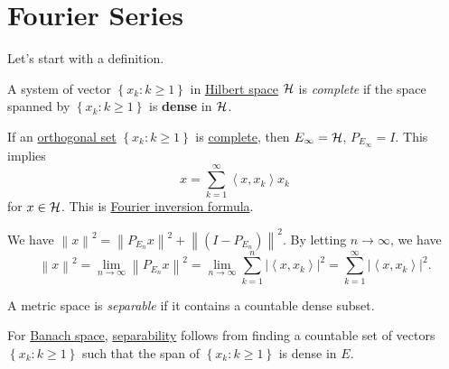 \section{Fourier Series}
Let's start with a definition.
\begin{definition}\label{def:complete-system}
	A system of vector \(\left\{ x_k\colon k\geq 1 \right\} \) in \hyperref[def:Hilbert-space]{Hilbert space} \(\mathcal{\MakeUppercase{h}} \) is \emph{complete} if the space spanned by \(\left\{ x_k\colon k\geq 1 \right\}\) is \textbf{dense} in \(\mathcal{\MakeUppercase{h}} \).
\end{definition}

\begin{eg}
	If an \hyperref[def:orthogonal-system]{orthogonal set} \(\left\{ x_{k} \colon k\geq 1 \right\} \) is \hyperref[def:complete-system]{complete}, then \(E_\infty = \mathcal{\MakeUppercase{h}} \), \(P_{E_\infty } = I\). This implies
	\[
		x = \sum_{k=1}^{\infty} \left\langle x, x_{k}  \right\rangle x_{k}
	\]
	for \(x\in \mathcal{\MakeUppercase{h}} \). This is \href{https://en.wikipedia.org/wiki/Fourier_inversion_theorem}{Fourier inversion formula}.
\end{eg}

\begin{remark}
	We have \(\left\lVert x\right\rVert ^{2} = \left\lVert P_{E_n} x \right\rVert^{2} + \left\lVert (I - P_{E_{n} })\right\rVert ^{2}\). By letting \(n \to \infty \), we have
	\[
		\left\lVert x\right\rVert^{2} = \lim\limits_{n \to \infty} \left\lVert P_{E_n}x\right\rVert ^{2} = \lim\limits_{n \to \infty} \sum_{k=1}^{n} \left\vert \left\langle x, x_{k}  \right\rangle  \right\vert ^{2} = \sum_{k=1}^{\infty} \left\vert \left\langle x, x_{k}  \right\rangle  \right\vert  ^{2}.
	\]
\end{remark}

\begin{definition}[Separable]\label{def:separable}
	A metric space is \emph{separable} if it contains a countable dense subset.
\end{definition}

\begin{remark}
	For \hyperref[def:Banach-space]{Banach space}, \hyperref[def:separable]{separability} follows from finding a countable set of vectors \(\left\{ x_{k} \colon k\geq 1 \right\} \) such that the span of \(\left\{ x_{k} \colon k\geq 1 \right\}\) is dense in \(E\).
\end{remark}

